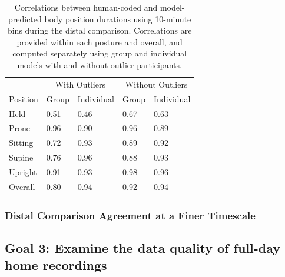 \documentclass[
  man]{apa6}
\begin{document}
\begin{table}[tbp]

\begin{center}
\begin{threeparttable}

\caption{\label{tab:pt2binstable}Correlations between human-coded and model-predicted body position durations using 10-minute bins during the distal comparison. Correlations are provided within each posture and overall, and computed separately using group and individual models with and without outlier participants.}

\begin{tabular}{lllll}
\toprule
 & \multicolumn{2}{c}{With Outliers} & \multicolumn{2}{c}{Without Outliers} \\
\cmidrule(r){2-3} \cmidrule(r){4-5}
Position & Group & Individual & Group & Individual\\
\midrule
Held & 0.51 & 0.46 & 0.67 & 0.63\\
Prone & 0.96 & 0.90 & 0.96 & 0.89\\
Sitting & 0.72 & 0.93 & 0.89 & 0.92\\
Supine & 0.76 & 0.96 & 0.88 & 0.93\\
Upright & 0.91 & 0.93 & 0.98 & 0.96\\ \midrule
Overall & 0.80 & 0.94 & 0.92 & 0.94\\
\bottomrule
\end{tabular}

\end{threeparttable}
\end{center}

\end{table}

\hypertarget{distal-comparison-agreement-at-a-finer-timescale}{%
\subsubsection{Distal Comparison Agreement at a Finer Timescale}\label{distal-comparison-agreement-at-a-finer-timescale}}

\hypertarget{goal-3-examine-the-data-quality-of-full-day-home-recordings}{%
\subsection{Goal 3: Examine the data quality of full-day home recordings}\label{goal-3-examine-the-data-quality-of-full-day-home-recordings}}
\end{document}
